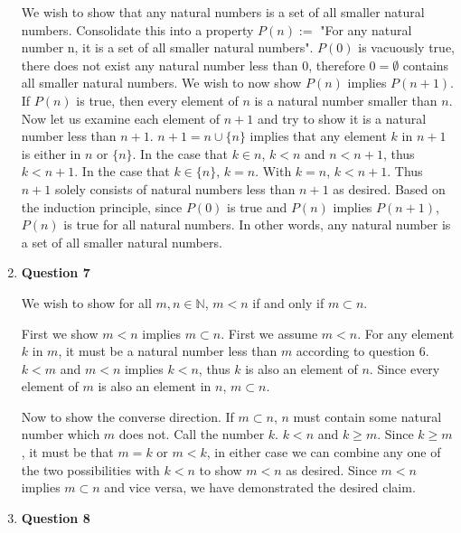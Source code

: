 \documentclass{article}
\begin{document}
\begin{enumerate}
	 We wish to show that any natural numbers is a set of all smaller natural numbers. Consolidate this into a property $P(n) := $ "For any natural number n, it is a set of all smaller natural numbers". $P(0)$ is vacuously true, there does not exist any natural number less than 0, therefore $0 = \emptyset$ contains all smaller natural numbers. We wish to now show $P(n)$ implies $P(n + 1)$. If $P(n)$ is true, then every element of $n$ is a natural number smaller than $n$. Now let us examine each element of $n + 1$ and try to show it is a natural number less than $n + 1$. $n + 1 = n \cup \{n\}$ implies that any element $k$ in $n + 1$ is either in $n$ or $\{n\}$. In the case that $k \in n$, $k < n$ and $n < n + 1$, thus $k < n + 1$. In the case that $k \in \{n\}$, $k = n$. With $k = n$, $k < n + 1$. Thus $n + 1$ solely consists of natural numbers less than $n + 1$ as desired. Based on the induction principle, since $P(0)$ is true and $P(n)$ implies $P(n + 1)$, $P(n)$ is true for all natural numbers. In other words, any natural number is a set of all smaller natural numbers.
	 
	 \newpage
	 \item \textbf{Question 7}
	 \medskip
	 
	 We wish to show for all $m, n \in \mathbb{N}$, $m < n$ if and only if $m \subset n$. 
	 
	 \medskip
	 First we show $m < n$ implies $m \subset n$. First we assume $m < n$. For any element $k$ in $m$, it must be a natural number less than $m$ according to question 6. $k < m$ and $m < n$ implies $k < n$, thus $k$ is also an element of $n$. Since every element of $m$ is also an element in $n$, $m \subset n$.
	 
	 \medskip
	 Now to show the converse direction. If $m \subset n$, $n$ must contain some natural number which $m$ does not. Call the number $k$. $k < n$ and $k \geq m$. Since $k \geq m$, it must be that $m = k$ or $m < k$, in either case we can combine any one of the two possibilities with $k < n$ to show $m < n$ as desired. Since $m < n$ implies $m \subset n$ and vice versa, we have demonstrated the desired claim.
	
	 \item \textbf{Question 8}
	 
	 \medskip
	 

\end{enumerate}
\end{document}
